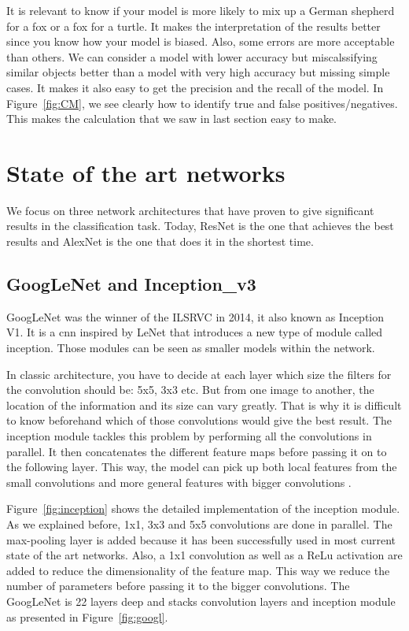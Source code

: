 It is relevant to know if your model is more likely to mix up  a German shepherd for a fox or a fox for a turtle. It makes the interpretation of the results better since you know how your model is biased. Also, some errors are more acceptable than others. We can consider a model with lower accuracy but miscalssifying similar objects better than a model with very high accuracy but missing simple cases. 
It makes it also easy to get the precision and the recall of the model. In Figure~\ref{fig:CM}, we see clearly how to identify true and false positives/negatives. This makes the calculation that we saw in last section easy to make. 

\section{State of the art networks}
We focus on three network architectures that have proven to give significant results in the classification task. Today, ResNet is the one that achieves the best results and AlexNet is the one that does it in the shortest time.    

\subsection{GoogLeNet and Inception\_v3}
GoogLeNet was the winner of the ILSRVC in 2014, it also known as Inception V1. It is a \gls{cnn} inspired by LeNet that introduces a new type of module called inception. Those modules can be seen as smaller models within the network. 

In classic architecture, you have to decide at each layer which size the filters for the convolution should be: 5x5, 3x3 etc. But from one image to another, the location of the information and its size can vary greatly. That is why it is difficult to know beforehand which of those convolutions would give the best result. The inception module tackles this problem by performing all the convolutions in parallel. It then concatenates the different feature maps before passing it on to the following layer. This way, the model can pick up both local features from the small convolutions and more general features with bigger convolutions \cite{googlepaper}. 

Figure~\ref{fig:inception} shows the detailed implementation of the inception module. As we explained before, 1x1, 3x3 and 5x5 convolutions are done in parallel. The max-pooling layer is added because it has been successfully used in most current state of the art networks. Also, a 1x1 convolution as well as a ReLu activation are added to reduce the dimensionality of the feature map. This way we reduce the number of parameters before passing it to the bigger convolutions. The GoogLeNet is 22 layers deep and stacks convolution layers and inception module as presented in Figure~\ref{fig:googl}.

